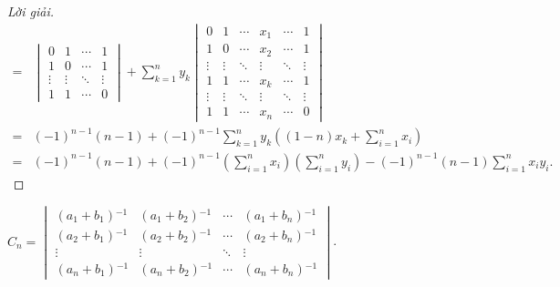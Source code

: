 \begin{proof}[Lời giải]
\begin{align*}
        = &
        \begin{vmatrix}
            0      & 1      & \cdots & 1      \\
            1      & 0      & \cdots & 1      \\
            \vdots & \vdots & \ddots & \vdots \\
            1      & 1      & \cdots & 0
        \end{vmatrix}
        +
        \sum^{n}_{k=1}y_{k}
        \begin{vmatrix}
            0      & 1      & \cdots & x_{1}  & \cdots & 1      \\
            1      & 0      & \cdots & x_{2}  & \cdots & 1      \\
            \vdots & \vdots & \ddots & \vdots & \ddots & \vdots \\
            1      & 1      & \cdots & x_{k}  & \cdots & 1      \\
            \vdots & \vdots & \ddots & \vdots & \ddots & \vdots \\
            1      & 1      & \cdots & x_{n}  & \cdots & 0
        \end{vmatrix}                                                                                               \\
        = &
        {(-1)}^{n-1}(n-1) + {(-1)}^{n-1}\sum^{n}_{k=1}y_{k}\left((1-n)x_{k} + \sum^{n}_{i=1}x_{i}\right)                                                  \\
        = & {(-1)}^{n-1}(n-1) + {(-1)}^{n-1}\left(\sum^{n}_{i=1}x_{i}\right)\left(\sum^{n}_{i=1}y_{i}\right) - {(-1)}^{n-1}(n-1)\sum^{n}_{i=1}x_{i}y_{i}.
    \end{align*}
    \endgroup{}
\end{proof}

\begin{exercise}
    $C_{n} = \begin{vmatrix}
            (a_{1} + b_{1}){}^{-1} & (a_{1} + b_{2}){}^{-1} & \cdots & (a_{1} + b_{n}){}^{-1} \\
            (a_{2} + b_{1}){}^{-1} & (a_{2} + b_{2}){}^{-1} & \cdots & (a_{2} + b_{n}){}^{-1} \\
            \vdots                 & \vdots                 & \ddots & \vdots                 \\
            (a_{n} + b_{1}){}^{-1} & (a_{n} + b_{2}){}^{-1} & \cdots & (a_{n} + b_{n}){}^{-1}
        \end{vmatrix}$.
\end{exercise}

